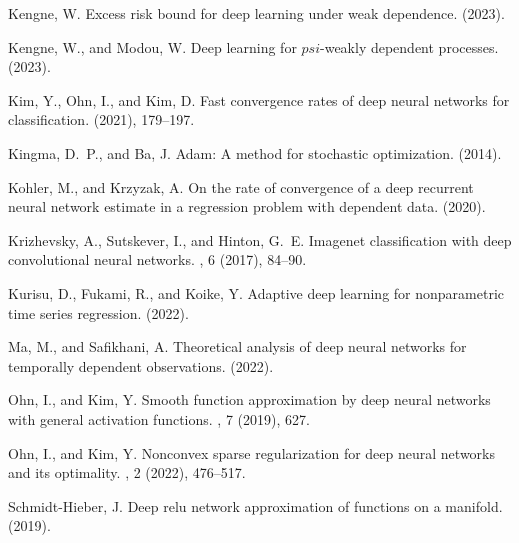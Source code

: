 \documentclass[10pt,twoside]{article}
\numberwithin{equation}{section}
\begin{document}
\begin{thebibliography}{10}
{\sc Kengne, W.}
\newblock Excess risk bound for deep learning under weak dependence.
 (2023).

{\sc Kengne, W., and Modou, W.}
\newblock Deep learning for $psi $-weakly dependent processes.
 (2023).

{\sc Kim, Y., Ohn, I., and Kim, D.}
\newblock Fast convergence rates of deep neural networks for classification.
 (2021), 179--197.

{\sc Kingma, D.~P., and Ba, J.}
\newblock Adam: A method for stochastic optimization.
 (2014).

{\sc Kohler, M., and Krzyzak, A.}
\newblock On the rate of convergence of a deep recurrent neural network
  estimate in a regression problem with dependent data.
 (2020).

{\sc Krizhevsky, A., Sutskever, I., and Hinton, G.~E.}
\newblock Imagenet classification with deep convolutional neural networks.
, 6 (2017), 84--90.

{\sc Kurisu, D., Fukami, R., and Koike, Y.}
\newblock Adaptive deep learning for nonparametric time series regression.
 (2022).

{\sc Ma, M., and Safikhani, A.}
\newblock Theoretical analysis of deep neural networks for temporally dependent
  observations.
 (2022).

{\sc Ohn, I., and Kim, Y.}
\newblock Smooth function approximation by deep neural networks with general
  activation functions.
, 7 (2019), 627.

{\sc Ohn, I., and Kim, Y.}
\newblock Nonconvex sparse regularization for deep neural networks and its
  optimality.
, 2 (2022), 476--517.

{\sc Schmidt-Hieber, J.}
\newblock Deep relu network approximation of functions on a manifold.
 (2019).


\end{thebibliography}
\end{document}
